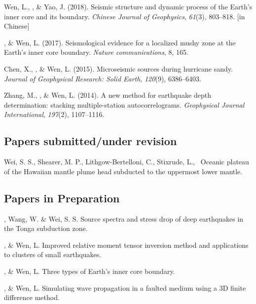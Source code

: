 \begin{etaremune}
\item
    Wen, L., \Tian, \& Yao, J. (2018).
    Seismic structure and dynamic process of the Earth's inner core and its boundary.
    \textit{Chinese Journal of Geophysics}, \textit{61}(3), 803--818.
     [in Chinese]
\item
    \Tian, \& Wen, L. (2017).
    Seismological evidence for a localized mushy zone at the Earth's inner core boundary.
    \textit{Nature communications}, 8, 165.
\item
    Chen, X., \Tian, \& Wen, L. (2015).
    Microseismic sources during hurricane sandy.
    \textit{Journal of Geophysical Research: Solid Earth}, \textit{120}(9), 6386--6403.
\item Zhang, M., \Tian, \& Wen, L. (2014).
    A new method for earthquake depth determination: stacking multiple-station autocorrelograms.
    \textit{Geophysical Journal International}, \textit{197}(2), 1107--1116.\\
\end{etaremune}

\subsection*{Papers submitted/under revision}
\begin{etaremune}
\item Wei, S. S., Shearer, M. P., Lithgow-Bertelloni, C., Stixrude, L., \Tian \
	Oceanic plateau of the Hawaiian mantle plume head subducted to the uppermost lower mantle.
\end{etaremune}


\subsection*{Papers in Preparation}
\begin{etaremune}
\item \Tian, Wang, W. \& Wei, S. S.
	Source spectra and stress drop of deep earthquakes in the Tonga subduction zone.
\item
    \Tian, \& Wen, L.
    Improved relative moment tensor inversion method and applications to clusters of small earthquakes.
\item
    \Tian, \& Wen, L.
    Three types of Earth's inner core boundary.
\item
    \Tian, \& Wen, L.
    Simulating wave propagation in a faulted medium using a 3D finite difference method.
\end{etaremune}
